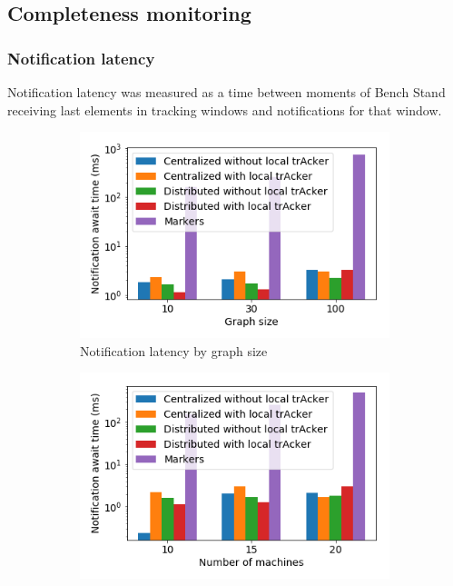 \subsection{Completeness monitoring} \label{completeness}

\subsubsection{Notification latency}

Notification latency was measured as a time between moments of Bench Stand receiving last elements in tracking windows and notifications for that window.

\begin{figure}[t!]
    \begin{subfigure}[b]{0.32\textwidth}
            \includegraphics[width=0.99\textwidth]{pics/notification_await_time_by_graph_size_bars.png}
            \caption{Notification latency by graph size}
    \end{subfigure}
    \hspace{5mm}
    \begin{subfigure}[b]{0.32\textwidth}
            \includegraphics[width=0.99\textwidth]{pics/notification_await_time_by_number_of_machines_bars.png}

\end{subfigure}
\end{figure}
